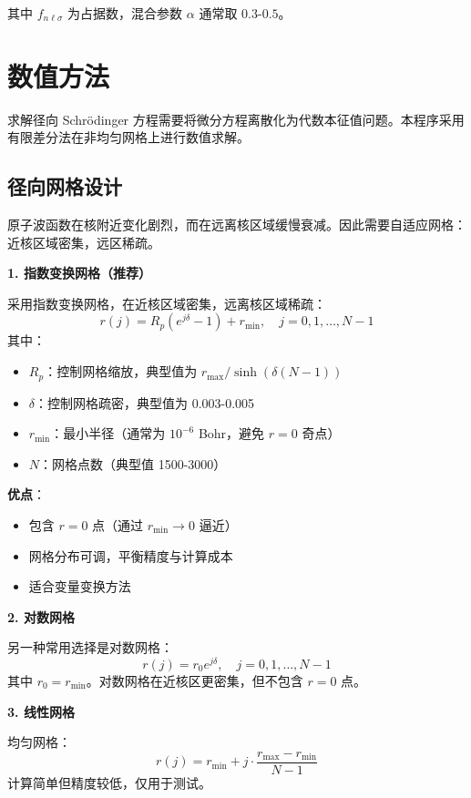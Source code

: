 \documentclass[12pt,a4paper]{article}
\begin{document}
其中 $f_{n\ell\sigma}$ 为占据数，混合参数 $\alpha$ 通常取 $0.3$-$0.5$。

\section{数值方法}

求解径向 Schrödinger 方程需要将微分方程离散化为代数本征值问题。本程序采用有限差分法在非均匀网格上进行数值求解。

\subsection{径向网格设计}

原子波函数在核附近变化剧烈，而在远离核区域缓慢衰减。因此需要自适应网格：近核区域密集，远区稀疏。

\textbf{1. 指数变换网格（推荐）}

采用指数变换网格，在近核区域密集，远离核区域稀疏：
\begin{equation}
    r(j) = R_p \left( e^{j\delta} - 1 \right) + r_{\min}, \quad j = 0, 1, \ldots, N-1
\end{equation}
其中：
\begin{itemize}
    \item $R_p$：控制网格缩放，典型值为 $r_{\max} / \sinh(\delta (N-1))$
    \item $\delta$：控制网格疏密，典型值为 0.003-0.005
    \item $r_{\min}$：最小半径（通常为 $10^{-6}$ Bohr，避免 $r=0$ 奇点）
    \item $N$：网格点数（典型值 1500-3000）
\end{itemize}

\textbf{优点}：
\begin{itemize}
    \item 包含 $r=0$ 点（通过 $r_{\min} \to 0$ 逼近）
    \item 网格分布可调，平衡精度与计算成本
    \item 适合变量变换方法
\end{itemize}

\textbf{2. 对数网格}

另一种常用选择是对数网格：
\begin{equation}
    r(j) = r_0 e^{j\delta}, \quad j = 0, 1, \ldots, N-1
\end{equation}
其中 $r_0 = r_{\min}$。对数网格在近核区更密集，但不包含 $r=0$ 点。

\textbf{3. 线性网格}

均匀网格：
\begin{equation}
    r(j) = r_{\min} + j \cdot \frac{r_{\max} - r_{\min}}{N-1}
\end{equation}
计算简单但精度较低，仅用于测试。
\end{document}
